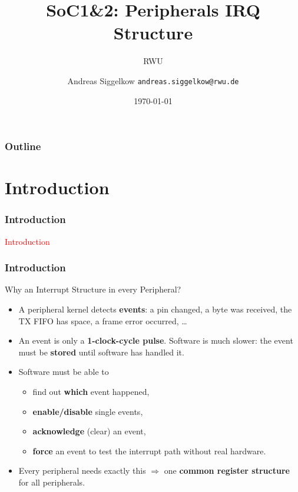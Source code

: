 \documentclass{beamer}
\title{SoC1\&2: Peripherals IRQ Structure}
\author[AS]{Andreas Siggelkow \newline \texttt{andreas.siggelkow@rwu.de}}
\date[2026]{\today}
\subtitle{RWU}
\institute{Elektrotechnik und Informatik}
\newcommand{\astitle}{nix}
\newcommand{\assubtitle}{nix}
\begin{document}
\setcounter{tocdepth}{1}

\begin{frame}
  \titlepage
\end{frame}

\begin{frame}
  \frametitle{Outline}
  \tableofcontents
\end{frame}

\section{Introduction}
\renewcommand{\astitle}{Introduction}
\begin{frame}
\frametitle{\astitle}
\textcolor{red}{Introduction}
\end{frame}

\renewcommand{\assubtitle}{Why an Interrupt Structure in every Peripheral?}
\begin{frame}
\frametitle{\astitle}
\begin{block}{\assubtitle}
  \begin{itemize}
    \item A peripheral kernel detects \textbf{events}: a pin changed, a byte was
      received, the TX FIFO has space, a frame error occurred, \ldots
    \item An event is only a \textbf{1-clock-cycle pulse}. Software is much slower:
      the event must be \textbf{stored} until software has handled it.
    \item Software must be able to
      \begin{itemize}
        \item find out \textbf{which} event happened,
        \item \textbf{enable/disable} single events,
        \item \textbf{acknowledge} (clear) an event,
        \item \textbf{force} an event to test the interrupt path without real hardware.
      \end{itemize}
    \item Every peripheral needs exactly this
      $\Rightarrow$ one \textbf{common register structure} for all peripherals.
  \end{itemize}
\end{block}
\end{frame}
\end{document}
